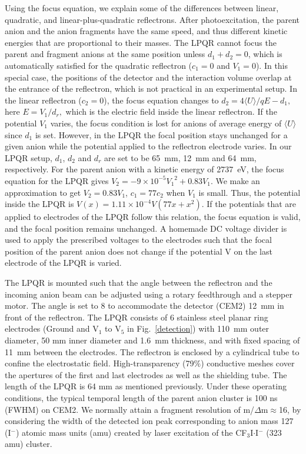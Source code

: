 \documentclass[%
aip,
rsi,
 amsmath,amssymb,
reprint,%
]{revtex4-1}
\begin{document}
Using the focus equation, we explain some of the differences between linear, quadratic, and linear-plus-quadratic reflectrons. After photoexcitation, the parent anion and the anion fragments have the same speed, and thus different kinetic energies that are proportional to their masses. The LPQR cannot focus the parent and fragment anions at the same position unless $d_1 +d_2 = 0$, which is automatically satisfied for the quadratic reflectron ($c_1 = 0$ and $V_1=0$). In this special case, the positions of the detector and the interaction volume overlap at the entrance of the reflectron, which is not practical in an experimental setup. In the linear reflectron ($c_2 = 0$), the focus equation changes to $d_2 = 4\langle{U}\rangle/{qE}-d_1,$ here $E = V_1/d_r,$ which is the electric field inside the linear reflectron. If the potential $V_1$ varies, the focus condition is lost for anions of average energy of $\langle{U}\rangle$ since $d_1$ is set. However, in the LPQR the focal position stays unchanged for a given anion while the potential applied to the reflectron electrode varies. In our LPQR setup, $d_1$, $d_2$ and $d_r$ are set to be 65~mm, 12~mm and 64~mm, respectively. For the parent anion with a kinetic energy of 2737~eV, the focus equation for the LPQR gives $V_2=-9\times10^{-5}{V_1}^2 + 0.83V_1.$ We make an approximation to get $V_2 = 0.83V_1$, $c_1 = 77c_2$ when $V_1$ is small. Thus, the potential inside the LPQR is $V(x) = 1.11\times 10^{-4} V (77x+x^2)$. If the potentials that are applied to electrodes of the LPQR follow this relation, the focus equation is valid, and the focal position remains unchanged. A homemade DC voltage divider is used to apply the prescribed voltages to the electrodes such that the focal position of the parent anion does not change if the potential V on the last electrode of the LPQR is varied.

The LPQR is mounted such that the angle between the reflectron and the incoming anion beam can be adjusted using a rotary feedthrough and a stepper motor. The angle is set to {8\textdegree} to accommodate the detector (CEM2) 12~mm in front of the reflectron. The LPQR consists of 6 stainless steel planar ring electrodes (Ground and V$_1$ to V$_5$ in Fig.~\ref{detection}) with 110~mm outer diameter, 50 mm inner diameter and 1.6~mm thickness, and with fixed spacing of 11~mm between the electrodes. The reflectron is enclosed by a cylindrical tube to confine the electrostatic field. High-transparency (79$\%$) conductive meshes cover the apertures of the first and last electrodes as well as the shielding tube. The length of the LPQR is 64 mm as mentioned previously. Under these operating conditions, the typical temporal length of the parent anion cluster is 100 ns (FWHM) on CEM2. We normally attain a fragment resolution of m/$\Delta$m$\approx$16, by considering the width of the detected ion peak corresponding to anion mass 127 (I$^-$) atomic mass units (amu) created by laser excitation of the CF$_3$I$\cdot$I$^-$ (323 amu) cluster.   
\end{document}
